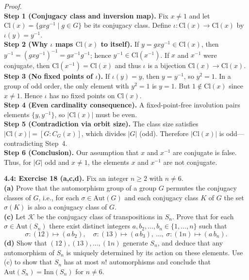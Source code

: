 \documentclass[11pt]{article}
\theoremstyle{definition}
\newcommand{\Aut}{\mathrm{Aut}}
\newcommand{\Inn}{\mathrm{Inn}}
\newcommand{\Cl}{\mathrm{Cl}}
\begin{document}
\emph{Proof.}\\
\textbf{Step 1 (Conjugacy class and inversion map).} Fix $x\neq 1$ and let $\Cl(x)=\{gxg^{-1}\mid g\in G\}$ be its conjugacy class. Define $\iota:\Cl(x)\to\Cl(x)$ by $\iota(y)=y^{-1}$.\\
\textbf{Step 2 (Why $\iota$ maps $\Cl(x)$ to itself).} If $y=gxg^{-1}\in\Cl(x)$, then $y^{-1}=(gxg^{-1})^{-1}=gx^{-1}g^{-1}$; hence $y^{-1}\in\Cl(x^{-1})$. If $x$ and $x^{-1}$ were conjugate, then $\Cl(x^{-1})=\Cl(x)$ and thus $\iota$ is a bijection $\Cl(x)\to\Cl(x)$.\\
\textbf{Step 3 (No fixed points of $\iota$).} If $\iota(y)=y$, then $y=y^{-1}$, so $y^2=1$. In a group of odd order, the only element with $y^2=1$ is $y=1$. But $1\notin\Cl(x)$ since $x\ne 1$. Hence $\iota$ has no fixed points on $\Cl(x)$.\\
\textbf{Step 4 (Even cardinality consequence).} A fixed-point-free involution pairs elements $\{y,y^{-1}\}$, so $|\Cl(x)|$ must be even.\\
\textbf{Step 5 (Contradiction via orbit size).} The class size satisfies $|\Cl(x)|=[G:C_G(x)]$, which divides $|G|$ (odd). Therefore $|\Cl(x)|$ is odd—contradicting Step~4.\\
\textbf{Step 6 (Conclusion).} Our assumption that $x$ and $x^{-1}$ are conjugate is false. Thus, for $|G|$ odd and $x\ne 1$, the elements $x$ and $x^{-1}$ are not conjugate.\\

\newpage

\newpage

\noindent \textbf{4.4: Exercise 18 (a,c,d).} Fix an integer $n\ge 2$ with $n\ne 6$.\\ %
\textbf{(a)} Prove that the automorphism group of a group $G$ permutes the conjugacy classes of $G$, i.e., for each $\sigma\in\Aut(G)$ and each conjugacy class $K$ of $G$ the set $\sigma(K)$ is also a conjugacy class of $G$.\\
\textbf{(c)} Let $\mathcal{K}$ be the conjugacy class of transpositions in $S_n$. Prove that for each $\sigma\in\Aut(S_n)$ there exist distinct integers $a,b_2,\ldots,b_n\in\{1,\ldots,n\}$ such that
\[
\sigma:(12)\mapsto (a\,b_2),\quad \sigma:(13)\mapsto (a\,b_3),\ \ldots,\ \sigma:(1n)\mapsto (a\,b_n).
\]
\textbf{(d)} Show that $(12),(13),\ldots,(1n)$ generate $S_n$, and deduce that any automorphism of $S_n$ is uniquely determined by its action on these elements. Use (c) to show that $S_n$ has at most $n!$ automorphisms and conclude that $\Aut(S_n)=\Inn(S_n)$ for $n\ne 6$.\\
\end{document}
